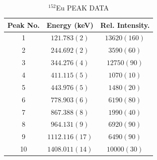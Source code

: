 \begin{table}
\caption{$^{152}$Eu PEAK DATA \label{tbl:152Eu-peaks}}
\begin{center}
\begin{tabular}{ccc}
\toprule
Peak No. & Energy (keV) & Rel. Intensity. \\ 
\midrule
1 & $121.783(2)$ & $13620(160)$ \\ 
2 & $244.692(2)$ & $3590(60)$ \\ 
3 & $344.276(4)$ & $12750(90)$ \\ 
4 & $411.115(5)$ & $1070(10)$ \\ 
5 & $443.976(5)$ & $1480(20)$ \\ 
6 & $778.903(6)$ & $6190(80)$ \\ 
7 & $867.388(8)$ & $1990(40)$ \\ 
8 & $964.131(9)$ & $6920(90)$ \\ 
9 & $1112.116(17)$ & $6490(90)$ \\ 
10 & $1408.011(14)$ & $10000(30)$ \\ 
\bottomrule
\end{tabular} 
\end{center}
\end{table}

